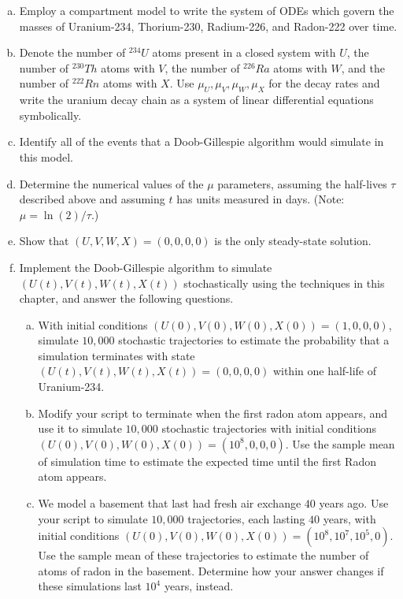 \begin{exercises}
\begin{enumerate}[(a)]
\item Employ a compartment model to write the system of ODEs which govern the masses of Uranium-234, Thorium-230, Radium-226, and Radon-222 over time.

\item Denote the number of ${}^{234}U$ atoms present in a closed system with $U$, the number of ${}^{230}Th$ atoms with $V$, the number of ${}^{226}Ra$ atoms with $W$, and the number of ${}^{222}Rn$ atoms with $X$. Use $\mu_U, \mu_V, \mu_W, \mu_X$ for the decay rates and write the uranium decay chain as a system of linear differential equations symbolically.

\item Identify all of the events that a Doob-Gillespie algorithm would simulate in this model.

\item Determine the numerical values of the $\mu$ parameters, assuming the half-lives $\tau$ described above and assuming $t$ has units measured in days. (Note: $\mu = \ln(2)/\tau$.)

\item Show that $(U, V, W, X) = (0, 0, 0, 0)$ is the only steady-state solution.

\item Implement the Doob-Gillespie algorithm to simulate $(U(t), V(t), W(t), X(t))$ stochastically using the techniques in this chapter, and answer the following questions.
\begin{enumerate}[(a)]
\item With initial conditions $(U(0), V(0), W(0), X(0)) = (1, 0, 0, 0)$, simulate $10,000$ stochastic trajectories to estimate the probability that a simulation terminates with state $(U(t), V(t), W(t), X(t)) = (0, 0, 0, 0)$ within one half-life of Uranium-234.

\item Modify your script to terminate when the first radon atom appears, and use it to simulate $10,000$ stochastic trajectories with initial conditions $(U(0), V(0), W(0), X(0)) = (10^8, 0, 0, 0)$. Use the sample mean of simulation time to estimate the expected time until the first Radon atom appears.

\item We model a basement that last had fresh air exchange $40$ years ago. Use your script to simulate $10,000$ trajectories, each lasting $40$ years, with initial conditions $(U(0), V(0), W(0), X(0)) = (10^8, 10^7, 10^5, 0)$. Use the sample mean of these trajectories to estimate the number of atoms of radon in the basement. Determine how your answer changes if these simulations last $10^4$ years, instead.


\end{enumerate}
\end{enumerate}
\end{exercises}
